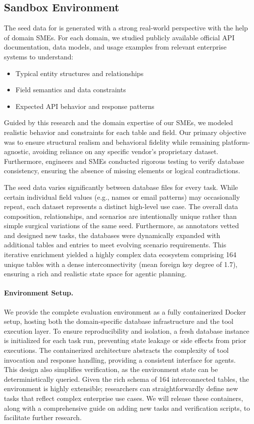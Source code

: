 \subsection{Sandbox Environment}
\label{app:sandbox}
The seed data for \dataset{} is generated with a strong real-world perspective with the help of domain SMEs. For each domain, we studied publicly available official API documentation, data models, and usage examples from relevant enterprise systems to understand:
\begin{itemize}
    \item Typical entity structures and relationships
    \item Field semantics and data constraints
    \item Expected API behavior and response patterns
\end{itemize}
Guided by this research and the domain expertise of our SMEs, we modeled realistic behavior and constraints for each table and field. Our primary objective was to ensure structural realism and behavioral fidelity while remaining platform-agnostic, avoiding reliance on any specific vendor's proprietary dataset. Furthermore, engineers and SMEs conducted rigorous testing to verify database consistency, ensuring the absence of missing elements or logical contradictions.

The seed data varies significantly between database files for every task. While certain individual field values (e.g., names or email patterns) may occasionally repeat, each dataset represents a distinct high-level use case. The overall data composition, relationships, and scenarios are intentionally unique rather than simple surgical variations of the same seed. Furthermore, as annotators vetted and designed new tasks, the databases were dynamically expanded with additional tables and entries to meet evolving scenario requirements. This iterative enrichment yielded a highly complex data ecosystem comprising 164 unique tables with a dense interconnectivity (mean foreign key degree of 1.7), ensuring a rich and realistic state space for agentic planning.

\paragraph{Environment Setup.} We provide the complete evaluation environment as a fully containerized Docker setup, hosting both the domain-specific database infrastructure and the tool execution layer. To ensure reproducibility and isolation, a fresh database instance is initialized for each task run, preventing state leakage or side effects from prior executions. The containerized architecture abstracts the complexity of tool invocation and response handling, providing a consistent interface for agents. This design also simplifies verification, as the environment state can be deterministically queried. Given the rich schema of 164 interconnected tables, the environment is highly extensible; researchers can straightforwardly define new tasks that reflect complex enterprise use cases. We will release these containers, along with a comprehensive guide on adding new tasks and verification scripts, to facilitate further research. 

